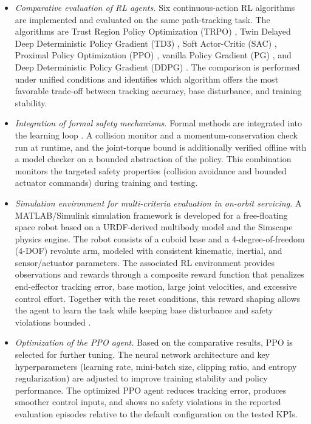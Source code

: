 \documentclass{ieeeaccess}
\begin{document}
\begin{itemize}
  \item \textit{Comparative evaluation of RL agents.} Six continuous-action RL algorithms are implemented and evaluated
  on the same path-tracking task. The algorithms are Trust Region Policy Optimization (TRPO) \cite{b14},
  Twin Delayed Deep
Deterministic Policy Gradient (TD3) \cite{b17}, Soft Actor-Critic (SAC) \cite{b18}, Proximal Policy Optimization
(PPO) \cite{b15}, vanilla Policy Gradient (PG) \cite{b21}, and Deep Deterministic Policy Gradient (DDPG) \cite{b7}.
The comparison is performed under unified conditions and identifies which algorithm offers the most
favorable trade-off between tracking accuracy, base disturbance, and training stability.
  \item \textit{Integration of formal safety mechanisms.} Formal methods are integrated into the learning loop
  \cite{b5, b6, b22, b23}. A collision monitor and a momentum-conservation check run at runtime,
  and the joint-torque bound is additionally verified offline with a model checker on a
  bounded abstraction of the policy. This combination monitors the targeted safety properties (collision avoidance
  and bounded actuator commands) during training and testing.
 \item \textit{Simulation environment for multi-criteria evaluation in on-orbit servicing.} A MATLAB/Simulink simulation framework is
 developed for a free-floating space robot based on a URDF-derived multibody model and the
 Simscape physics engine. The robot consists of a cuboid base and a 4-degree-of-freedom (4-DOF)
 revolute arm, modeled with consistent kinematic, inertial, and sensor/actuator parameters. The associated RL environment
 provides observations and rewards through a composite reward function that penalizes end-effector tracking error,
 base motion, large joint velocities, and excessive control effort. Together with the reset conditions,
 this reward shaping allows the agent to learn the task while keeping base disturbance
 and safety violations bounded \cite{b25,b26,b27,b28,b7}.
 \item \textit{Optimization of the PPO agent.} Based on the comparative results, PPO is selected
 for further tuning. The neural network architecture and key hyperparameters (learning rate, mini-batch size,
 clipping ratio, and entropy regularization) are adjusted to improve training stability and policy performance.
 The optimized PPO agent reduces tracking error, produces smoother control inputs, and shows no
 safety violations in the reported evaluation episodes relative to the default configuration on the
 tested KPIs.
\end{itemize}
\end{document}
